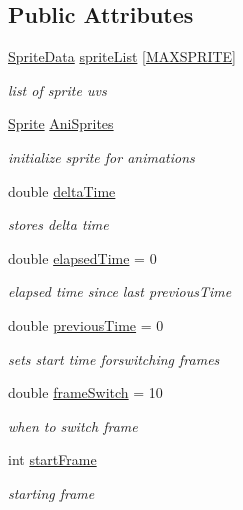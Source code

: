 \subsection*{Public Attributes}
\begin{DoxyCompactItemize}
\item 
\hyperlink{struct_sprite_data}{Sprite\+Data} \hyperlink{class_animator_a489c91d2c63336faf1fac7c0ad866126}{sprite\+List} \mbox{[}\hyperlink{_animator_8h_a2e880c677ee810c3f221b3b5636ff7e0}{M\+A\+X\+S\+P\+R\+I\+T\+E}\mbox{]}
\begin{DoxyCompactList}\small\item\em list of sprite uvs \end{DoxyCompactList}\item 
\hyperlink{class_sprite}{Sprite} \hyperlink{class_animator_a0fef9defed4c30c0183b3c61c3a243e2}{Ani\+Sprites}
\begin{DoxyCompactList}\small\item\em initialize sprite for animations \end{DoxyCompactList}\item 
double \hyperlink{class_animator_aa81ac1ce666ba7a0c2510494420ab85e}{delta\+Time}
\begin{DoxyCompactList}\small\item\em stores delta time \end{DoxyCompactList}\item 
double \hyperlink{class_animator_ad4e7ef21255ce54402021eca4d70b203}{elapsed\+Time} = 0
\begin{DoxyCompactList}\small\item\em elapsed time since last previous\+Time \end{DoxyCompactList}\item 
double \hyperlink{class_animator_a65c0a630e6da7004a0cbb6d92eee7238}{previous\+Time} = 0
\begin{DoxyCompactList}\small\item\em sets start time forswitching frames \end{DoxyCompactList}\item 
double \hyperlink{class_animator_a955f8216878caa737846d23d8cc86ecb}{frame\+Switch} = 10
\begin{DoxyCompactList}\small\item\em when to switch frame \end{DoxyCompactList}\item 
int \hyperlink{class_animator_ab904a1e936e9c123c4f36077d41c515c}{start\+Frame}
\begin{DoxyCompactList}\small\item\em starting frame \end{DoxyCompactList}\item 

\end{DoxyCompactItemize}
